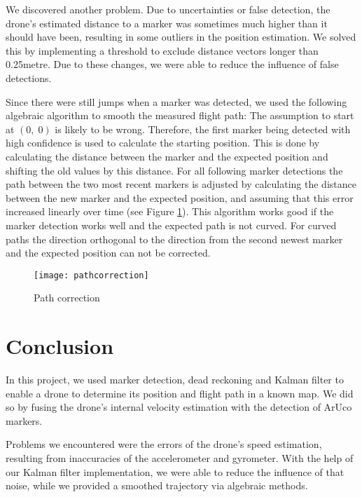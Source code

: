 \documentclass[12pt]{article}
\begin{document}
We discovered another problem. Due to uncertainties or false detection, the drone's estimated distance to a marker was sometimes much higher than it should have been, resulting in some outliers in the position estimation. We solved this by implementing a threshold to exclude distance vectors longer than \num{0.25}\si{metre}. Due to these changes, we were able to reduce the influence of false detections.

Since there were still jumps when a marker was detected, we used the following algebraic algorithm to smooth the measured flight path: The assumption to start at \((0, \; 0)\) is likely to be wrong. Therefore, the first marker being detected with high confidence is used to calculate the starting position. This is done by calculating the distance between the marker and the expected position and shifting the old values by this distance. For all following marker detections the path between the two most recent markers is adjusted by calculating the distance between the new marker and the expected position, and assuming that this error increased linearly over time (see Figure \ref{fig:correction}). This algorithm works good if the marker detection works well and the expected path is not curved. For curved paths the direction orthogonal to the direction from the second newest marker and the expected position can not be corrected. 

\begin{figure}[htbp]
	\centering
	\texttt{[image: pathcorrection]}
	\caption{Path correction}
	\label{fig:correction}
\end{figure}

\section{Conclusion} \label{sec:Conclusion}

In this project, we used marker detection, dead reckoning and Kalman filter to enable a drone to determine its position and flight path in a known map. We did so by fusing the drone's internal velocity estimation with the detection of ArUco markers.

Problems we encountered were the errors of the drone's speed estimation, resulting from inaccuracies of the accelerometer and gyrometer. With the help of our Kalman filter implementation, we were able to reduce the influence of that noise, while we provided a smoothed trajectory via algebraic methods.
\end{document}
